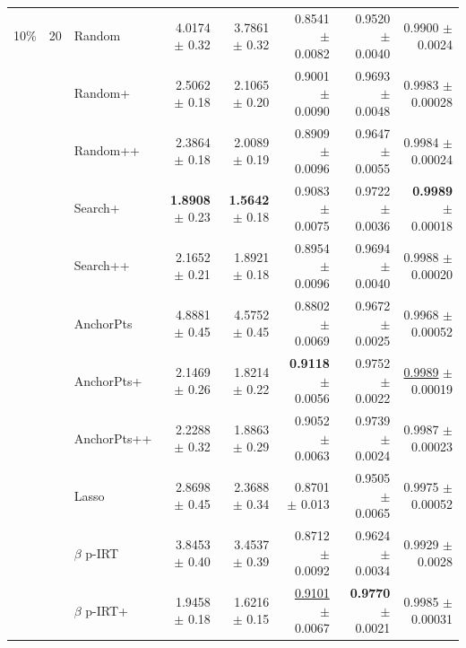 \begin{longtable}{llp{}rrrrr}
\midrule
10\% & 20 & Random & 4.0174 {\scriptsize $\pm$ 0.32} & 3.7861 {\scriptsize $\pm$ 0.32} & 0.8541 {\scriptsize $\pm$ 0.0082} & 0.9520 {\scriptsize $\pm$ 0.0040} & 0.9900 {\scriptsize $\pm$ 0.0024} \\
 &  & Random+ & 2.5062 {\scriptsize $\pm$ 0.18} & 2.1065 {\scriptsize $\pm$ 0.20} & 0.9001 {\scriptsize $\pm$ 0.0090} & 0.9693 {\scriptsize $\pm$ 0.0048} & 0.9983 {\scriptsize $\pm$ 0.00028} \\
 &  & Random++ & 2.3864 {\scriptsize $\pm$ 0.18} & 2.0089 {\scriptsize $\pm$ 0.19} & 0.8909 {\scriptsize $\pm$ 0.0096} & 0.9647 {\scriptsize $\pm$ 0.0055} & 0.9984 {\scriptsize $\pm$ 0.00024} \\
 &  & Search+ & \textbf{1.8908} {\scriptsize $\pm$ 0.23} & \textbf{1.5642} {\scriptsize $\pm$ 0.18} & 0.9083 {\scriptsize $\pm$ 0.0075} & 0.9722 {\scriptsize $\pm$ 0.0036} & \textbf{0.9989} {\scriptsize $\pm$ 0.00018} \\
 &  & Search++ & 2.1652 {\scriptsize $\pm$ 0.21} & 1.8921 {\scriptsize $\pm$ 0.18} & 0.8954 {\scriptsize $\pm$ 0.0096} & 0.9694 {\scriptsize $\pm$ 0.0040} & 0.9988 {\scriptsize $\pm$ 0.00020} \\
 &  & AnchorPts & 4.8881 {\scriptsize $\pm$ 0.45} & 4.5752 {\scriptsize $\pm$ 0.45} & 0.8802 {\scriptsize $\pm$ 0.0069} & 0.9672 {\scriptsize $\pm$ 0.0025} & 0.9968 {\scriptsize $\pm$ 0.00052} \\
 &  & AnchorPts+ & 2.1469 {\scriptsize $\pm$ 0.26} & 1.8214 {\scriptsize $\pm$ 0.22} & \textbf{0.9118} {\scriptsize $\pm$ 0.0056} & 0.9752 {\scriptsize $\pm$ 0.0022} & \underline{0.9989} {\scriptsize $\pm$ 0.00019} \\
 &  & AnchorPts++ & 2.2288 {\scriptsize $\pm$ 0.32} & 1.8863 {\scriptsize $\pm$ 0.29} & 0.9052 {\scriptsize $\pm$ 0.0063} & 0.9739 {\scriptsize $\pm$ 0.0024} & 0.9987 {\scriptsize $\pm$ 0.00023} \\
 &  & Lasso & 2.8698 {\scriptsize $\pm$ 0.45} & 2.3688 {\scriptsize $\pm$ 0.34} & 0.8701 {\scriptsize $\pm$ 0.013} & 0.9505 {\scriptsize $\pm$ 0.0065} & 0.9975 {\scriptsize $\pm$ 0.00052} \\
 &  & $\beta$ p-IRT & 3.8453 {\scriptsize $\pm$ 0.40} & 3.4537 {\scriptsize $\pm$ 0.39} & 0.8712 {\scriptsize $\pm$ 0.0092} & 0.9624 {\scriptsize $\pm$ 0.0034} & 0.9929 {\scriptsize $\pm$ 0.0028} \\
 &  & $\beta$ p-IRT+ & 1.9458 {\scriptsize $\pm$ 0.18} & 1.6216 {\scriptsize $\pm$ 0.15} & \underline{0.9101} {\scriptsize $\pm$ 0.0067} & \textbf{0.9770} {\scriptsize $\pm$ 0.0021} & 0.9985 {\scriptsize $\pm$ 0.00031} \\

\end{longtable}

